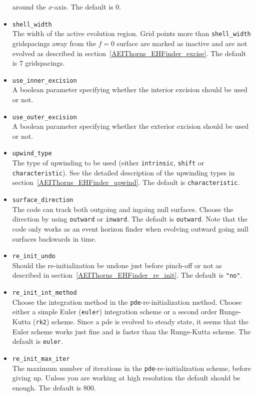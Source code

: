 \begin{itemize}
  around the $x$-axis. The default is 0.
\item {\tt shell\_width} \\
  The width of the active evolution region. Grid points more than
  {\tt shell\_width} gridspacings away from the $f=0$ surface are marked
  as inactive and are not evolved as described in
  section~\ref{AEIThorns_EHFinder_excise}. The default is $7$
  gridspacings.
\item {\tt use\_inner\_excision} \\
  A boolean parameter specifying whether the interior excision should be
  used or not.
\item {\tt use\_outer\_excision} \\
  A boolean parameter specifying whether the exterior excision should be
  used or not.
\item {\tt upwind\_type} \\
  The type of upwinding to be used (either {\tt intrinsic}, {\tt shift} or 
  {\tt characteristic}). See the detailed description of the upwinding types
  in section~\ref{AEIThorns_EHFinder_upwind}. The default is 
  {\tt characteristic}.
\item {\tt surface\_direction} \\
  The code can track both outgoing and ingoing null surfaces. Choose the 
  direction by using {\tt outward} or {\tt inward}. The default is
  {\tt outward}. Note that the code only works as an event horizon finder
  when evolving outward going null surfaces backwards in time.
\item {\tt re\_init\_undo} \\
  Should the re-initialization be undone just before pinch-off or not as
  described in section~\ref{AEIThorns_EHFinder_re_init}. The
  default is {\tt "no"}.
\item {\tt re\_init\_int\_method} \\
  Choose the integration method in the {\tt pde}-re-initialization method.
  Choose either a simple Euler ({\tt euler}) integration scheme or a second
  order Runge-Kutta ({\tt rk2}) scheme. Since a pde is evolved to steady state,
  it seems that the Euler scheme works just fine and is faster than the
  Runge-Kutta scheme. The default is {\tt euler}.
\item {\tt re\_init\_max\_iter} \\
  The maximum number of iterations in the {\tt pde}-re-initialization scheme,
  before giving up. Unless you are working at high resolution the default
  should be enough. The default is 800.

\end{itemize}
